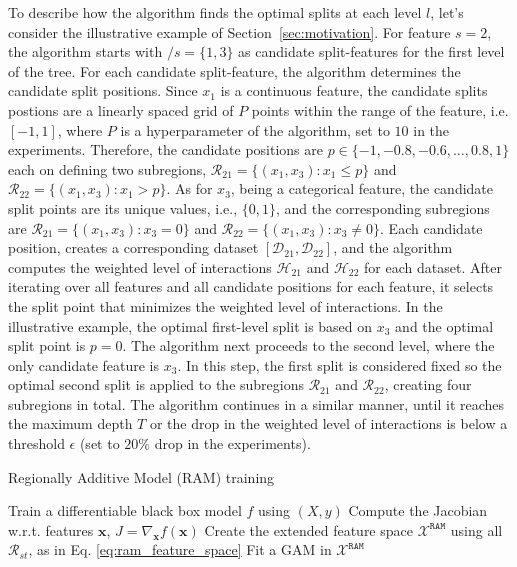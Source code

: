 \documentclass[12pt]{article}
\newcommand{\xb}{\mathbf{x}}
\newcommand{\Xcal}{\mathcal{X}}
\begin{document}
To describe how the algorithm finds the optimal splits at each level $l$, let's consider the illustrative example of Section~\ref{sec:motivation}.
For feature $s=2$, the algorithm starts with $/s = \{1, 3\}$ as candidate split-features for the first level of the tree.
For each candidate split-feature, the algorithm determines the candidate split positions.
Since $x_1$ is a continuous feature, the candidate splits postions are a linearly spaced grid of $P$ points within the range of the feature, i.e. $[-1, 1]$,
where $P$ is a hyperparameter of the algorithm, set to $10$ in the experiments.
Therefore, the candidate positions are $p \in \{-1, -0.8, -0.6, \ldots, 0.8, 1\}$ each on defining two subregions,
$\mathcal{R}_{21} = \{ (x_1, x_3) : x_1 \leq p \}$ and $\mathcal{R}_{22} = \{ (x_1, x_3) : x_1 > p \}$.
As for $x_3$, being a categorical feature, the candidate split points are its unique values, i.e., $\{0, 1\}$,
and the corresponding subregions are $\mathcal{R}_{21} = \{ (x_1, x_3) : x_3 = 0 \}$ and $\mathcal{R}_{22} = \{ (x_1, x_3) : x_3 \neq 0 \}$.
Each candidate position, creates a corresponding dataset $[\mathcal{D}_{21}, \mathcal{D}_{22}]$,
and the algorithm computes the weighted level of interactions $\mathcal{H}_{21}$ and $\mathcal{H}_{22}$ for each dataset.
After iterating over all features and all candidate positions for each feature,
it selects the split point that minimizes the weighted level of interactions.
In the illustrative example, the optimal first-level split is based on $x_3$ and the optimal split point is $p = 0$.
The algorithm next proceeds to the second level, where the only candidate feature is $x_3$.
In this step, the first split is considered fixed so the optimal second split is applied to the subregions $\mathcal{R}_{21}$ and $\mathcal{R}_{22}$,
creating four subregions in total.
The algorithm continues in a similar manner, until it reaches the maximum depth $T$ or the drop in the weighted level of interactions is below a threshold $\epsilon$ (set to $20\%$ drop in the experiments).


\begin{algorithm}
\caption{Regionally Additive Model (RAM) training}
\label{alg:ram}
\SetAlgoLined
{}
\BlankLine
{}
  \BlankLine
  Train a differentiable black box model $f$ using $(X, y)$\;
  Compute the Jacobian w.r.t. features $\xb$,  $J = \nabla_{\xb}f(\xb)$ \;
  Create the extended feature space $\mathcal{X}^{\mathtt{RAM}}$ using all
  $\mathcal{R}_{st}$, as in Eq. \eqref{eq:ram_feature_space} \;
  Fit a GAM in $\mathcal{X}^{\mathtt{RAM}}$ 
  \Return{$f^{\mathtt{RAM}}(\xb) = c + \sum_{s,t} f_{st}(x_{st}), \quad \xb \in \Xcal^{\mathtt{RAM}}$}
\end{algorithm}
\end{document}
